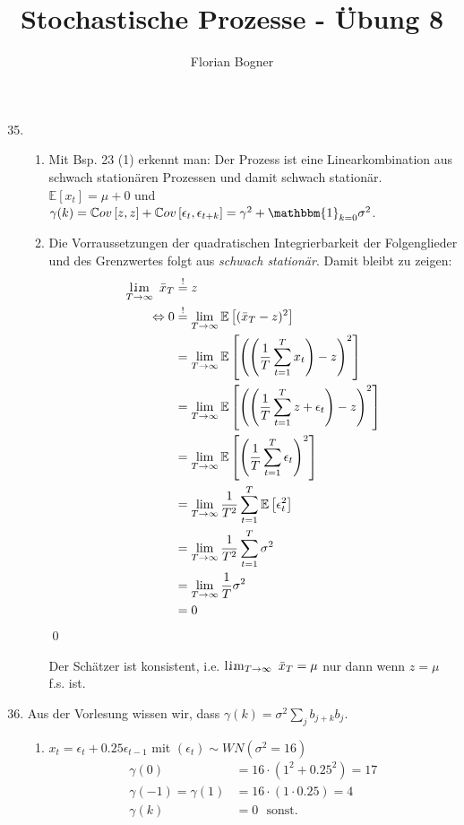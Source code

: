 \documentclass[a4paper,11pt,notitlepage,fullpage]{article}
\newcommand{\E}[1]{\mathbb E\left[#1\right]}
\newcommand{\Cov}[1]{\mathbb Cov\left[#1\right]}
\newcommand{\indd}[1]{\mathbbm{1}_{#1}}
\DeclareMathOperator*{\limm}{l.\hspace{-0.18em}i.\hspace{-0.19em}m}
\begin{document}
\author{Florian Bogner}
\title{Stochastische Prozesse - Übung 8}
\maketitle

\begin{enumerate}
\setcounter{enumi}{34}

\item 
\begin{enumerate}
\item Mit Bsp. 23 (1) erkennt man: Der Prozess ist eine Linearkombination aus schwach stationären Prozessen und damit schwach stationär. $\E{x_t} = \mu + 0$ und $\gamma(k) = \Cov{z, z} + \Cov{\epsilon_t, \epsilon_{t+k}} = \gamma^2 + \indd{k=0}\sigma^2$.

\item Die Vorraussetzungen der quadratischen Integrierbarkeit der Folgenglieder und des Grenzwertes folgt aus \emph{schwach stationär}. Damit bleibt zu zeigen:
\begin{align*}
\limm_{T\to\infty}~\bar x_T &\stackrel{!}{=} z \\
\Leftrightarrow 0 &\stackrel{!}{=} \lim_{T\to\infty} \E{(\bar x_T - z)^2} \\
&= \lim_{T\to\infty} \E{\left(\left(\frac{1}{T}\sum_{t=1}^T x_t\right) - z\right)^2} \\
&= \lim_{T\to\infty} \E{\left(\left(\frac{1}{T}\sum_{t=1}^T z + \epsilon_t\right) - z\right)^2} \\
&= \lim_{T\to\infty} \E{\left(\frac{1}{T}\sum_{t=1}^T \epsilon_t\right)^2} \\
&= \lim_{T\to\infty} \frac{1}{T^2} \sum_{t=1}^T \E{\epsilon_t^2} \\
&= \lim_{T\to\infty} \frac{1}{T^2} \sum_{t=1}^T \sigma^2 \\
&= \lim_{T\to\infty} \frac{1}{T} \sigma^2 \\
&= 0
\end{align*}
\qed

Der Schätzer ist konsistent, i.e. $\limm_{T\to\infty}~\bar x_T = \mu$ nur dann wenn $z = \mu$ f.s. ist.
\end{enumerate}

\newpage
\item Aus der Vorlesung wissen wir, dass $\gamma(k) = \sigma^2 \sum_j b_{j+k}b_j$.
\begin{enumerate}
\item $x_t = \epsilon_t + 0.25 \epsilon_{t-1}$ mit $(\epsilon_t) \sim WN(\sigma^2 = 16)$
\begin{align*}
\gamma(0) &= 16 \cdot (1^2 + 0.25^2) = 17 \\
\gamma(-1) = \gamma(1) &= 16 \cdot (1 \cdot 0.25) = 4 \\
\gamma(k) &= 0~~~\text{sonst.}
\end{align*}


\end{enumerate}
\end{enumerate}
\end{document}
